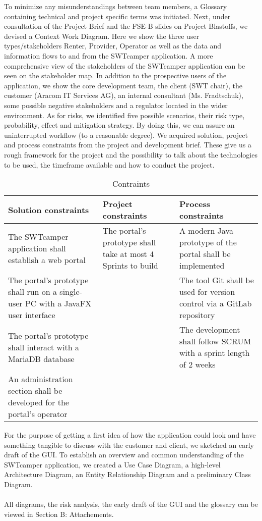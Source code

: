 To minimize any misunderstandings between team members, a Glossary containing technical and project specific terms was initiated.
Next, under consultation of the Project Brief and the FSE-B slides on Project Blastoffs, we devised a Context Work Diagram. Here we show the three user types/stakeholders Renter, Provider, Operator as well as the data and information flows to and from the SWTcamper application.
A more comprehensive view of the stakeholders of the SWTcamper application can be seen on the stakeholder map. In addition to the prospective users of the application, we show the core development team, the client (SWT chair), the customer (Aracom IT Services AG), an internal consultant (Ms. Fradtschuk), some possible negative stakeholders and a regulator located in the wider environment.
As for risks, we identified five possible scenarios, their risk type, probability, effect and mitigation strategy. By doing this, we can assure an uninterrupted workflow (to a reasonable degree).
We acquired solution, project and process constraints from the project and development brief. These give us a rough framework for the project and the possibility to talk about the technologies to be used, the timeframe available and how to conduct the project.

\begin{table}[h]
    \centering
    \caption{Contraints}
    \begin{tabular}{|p{4cm}|p{4cm}|p{4cm}|}
        \hline
        \textbf{Solution constraints} & \textbf{Project constraints} & \textbf{Process constraints} \\ \hline
        The SWTcamper application shall establish a web portal & The portal's prototype shall take at most 4 Sprints to build & A modern Java prototype of the portal shall be implemented \\ \hline
        The portal's prototype shall run on a single-user PC with a JavaFX user interface &  & The tool Git shall be used for version control via a GitLab repository \\ \hline
        The portal's prototype shall interact with a MariaDB database &  & The development shall follow SCRUM with a sprint length of 2 weeks \\ \hline
        An administration section shall be developed for the portal's operator &  &  \\ \hline
    \end{tabular}
\end{table}

For the purpose of getting a first idea of how the application could look and have something tangible to discuss with the customer and client, we sketched an early draft of the GUI.
To establish an overview and common understanding of the SWTcamper application, we created a Use Case Diagram, a high-level Architecture Diagram, an Entity Relationship Diagram and a preliminary Class Diagram.
\\
\\
All diagrams, the risk analysis, the early draft of the GUI and the glossary can be viewed in Section B: Attachements.